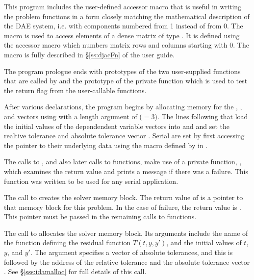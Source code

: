 This program includes the user-defined accessor macro
 that is useful in writing the problem functions in a form
closely matching the mathematical description of the DAE system,
i.e. with components numbered from 1 instead of from 0.
The  macro is used to access elements of a dense matrix of
type . It is defined using the {\dense} accessor macro
 which numbers matrix rows and columns starting with
0. The macro  is fully described in \S\ref{ss:djacFn} 
of the user guide.

The program prologue ends with prototypes of the two user-supplied functions 
that are called by {\ida} and the prototype of the private function
 which is used to test the return flag from the {\ida}
user-callable functions.

After various declarations, the  program begins by
allocating memory for the , , and  vectors using
 with a length argument of  ($= 3$). The
lines following that load the initial values of the dependendent
variable vectors into  and  and set the realtive tolerance 
 and absolute tolerance vector . Serial  
are set by first accessing the pointer to their underlying data using
the macro  defined by {\nvecs} in .

The calls to , and also later calls to 
functions, make use of a private function, , which examines
the return value and prints a message if there was a failure.  This
 function was written to be used for any serial {\sundials}
application.

The call to  creates the {\ida} solver memory block.
The return value of is a pointer to that memory block for this
problem.  In the case of failure, the return value is .  This
pointer must be passed in the remaining calls to {\ida} functions.

The call to  allocates the solver memory block.
Its arguments include the name of the {\C} function  defining the
residual function $T(t,y,y')$, and the initial values of $t$, $y$, and $y'$.
The argument  specifies a vector of absolute tolerances, and
this is followed by the address of the relative tolerance 
and the absolute tolerance vector .
See \S\ref{sss:idamalloc} for full details of this call.

